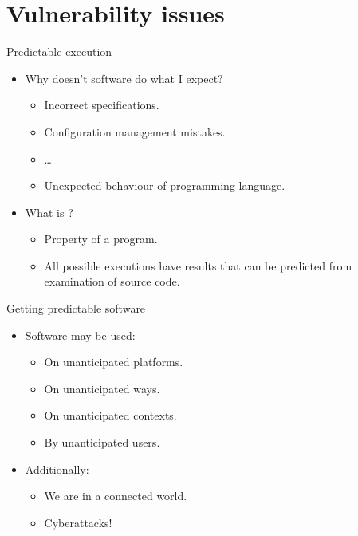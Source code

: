 \section{Vulnerability issues}

\begin{frame}[t]{Predictable execution}
\begin{itemize}
  \item Why doesn't software do what I expect?
    \begin{itemize}
      \item Incorrect specifications.
      \item Configuration management mistakes.
      \item \ldots
      \item Unexpected behaviour of programming language.
    \end{itemize}

  \vfill\pause
  \item What is ?
    \begin{itemize}
      \item Property of a program.
      \item All possible executions have results that can be predicted from examination 
            of source code.
    \end{itemize}
\end{itemize}
\end{frame}

\begin{frame}[t]{Getting predictable software}
\begin{itemize}
  \item Software may be used:
    \begin{itemize}
      \item On unanticipated platforms.
      \item On unanticipated ways.
      \item On unanticipated contexts.
      \item By unanticipated users.
    \end{itemize}

  \vfill
  \item Additionally:
    \begin{itemize}
      \item We are in a connected world.
      \item Cyberattacks!
    \end{itemize}
\end{itemize}
\end{frame}

